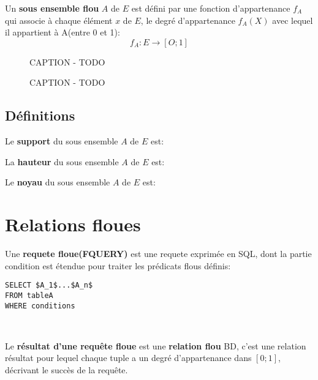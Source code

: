 \documentclass[a4paper,11pt]{article}
\begin{document}
Un \textbf{sous ensemble flou} $A$ de $E$ est défini par une fonction d'appartenance $f_A$ qui associe à chaque élément $x$ de $E$, le degré d'appartenance $f_A(X)$ avec lequel il appartient à A(entre 0 et 1):$$f_A:E\rightarrow[O;1]$$

		\begin{figure}[!h]
			\centering
			
			\caption{CAPTION - TODO}
		\end{figure}
		
		\begin{figure}[!h]
			\centering
			
			\caption{CAPTION - TODO}
		\end{figure}
		
\subsection{Définitions}

Le \textbf{support} du sous ensemble $A$ de $E$ est: \begin{center}  \end{center}

La \textbf{hauteur} du sous ensemble $A$ de $E$ est: \begin{center}  \end{center}

Le \textbf{noyau} du sous ensemble $A$ de $E$ est: \begin{center}  \end{center}

\section{Relations floues}
Une \textbf{requete floue(FQUERY)} est une requete exprimée en SQL, dont la partie condition est étendue pour traiter les prédicats flous définis:\\

\begin{lstlisting}[mathescape]
SELECT $A_1$...$A_n$
FROM tableA
WHERE conditions
\end{lstlisting}
~

Le \textbf{résultat d'une requête floue} est une \textbf{relation flou} BD, c'est une relation résultat pour lequel chaque tuple a un degré d'appartenance dans $[0;1]$, décrivant le succès de la requête.
\end{document}
